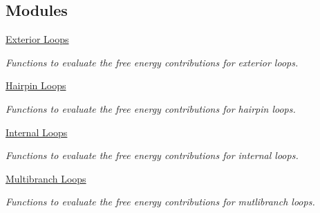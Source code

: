 \subsection*{Modules}
\begin{DoxyCompactItemize}
\item 
\hyperlink{group__eval__loops__ext}{Exterior Loops}
\begin{DoxyCompactList}\small\item\em Functions to evaluate the free energy contributions for exterior loops. \end{DoxyCompactList}\item 
\hyperlink{group__eval__loops__hp}{Hairpin Loops}
\begin{DoxyCompactList}\small\item\em Functions to evaluate the free energy contributions for hairpin loops. \end{DoxyCompactList}\item 
\hyperlink{group__eval__loops__int}{Internal Loops}
\begin{DoxyCompactList}\small\item\em Functions to evaluate the free energy contributions for internal loops. \end{DoxyCompactList}\item 
\hyperlink{group__eval__loops__mb}{Multibranch Loops}
\begin{DoxyCompactList}\small\item\em Functions to evaluate the free energy contributions for mutlibranch loops. \end{DoxyCompactList}\end{DoxyCompactItemize}
